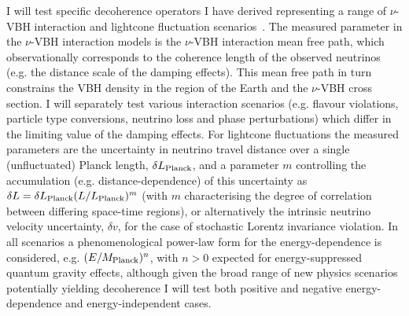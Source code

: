 \documentclass[a4paper,11pt]{article}
\begin{document}
I will test specific decoherence operators I have derived representing a range of $\nu$-VBH interaction and lightcone fluctuation scenarios~\cite{PhysRevD.102.115003, 2103.15313}. The measured parameter in the $\nu$-VBH interaction models is the $\nu$-VBH interaction mean free path, which observationally corresponds to the coherence length of the observed neutrinos (e.g. the distance scale of the damping effects). This mean free path in turn constrains the VBH density in the region of the Earth and the $\nu$-VBH cross section. I will separately test various interaction scenarios (e.g. flavour violations, particle type conversions, neutrino loss and phase perturbations) which differ in the limiting value of the damping effects. For lightcone fluctuations the measured parameters are the uncertainty in neutrino travel distance over a single (unfluctuated) Planck length, $\delta L_{\rm{Planck}}$, and a parameter $m$ controlling the accumulation (e.g. distance-dependence) of this uncertainty as $\delta L =\delta L_{\rm{Planck}} (L/L_{\rm{Planck}})^m$ (with $m$ characterising the degree of correlation between differing space-time regions), or alternatively the intrinsic neutrino velocity uncertainty, $\delta v$, for the case of stochastic Lorentz invariance violation. In all scenarios a phenomenological power-law form for the energy-dependence is considered, e.g. $(E/M_{\rm{Planck}})^n$, with $n>0$ expected for energy-suppressed quantum gravity effects, although given the broad range of new physics scenarios potentially yielding decoherence I will test both positive and negative energy-dependence and energy-independent cases.


\end{document}
